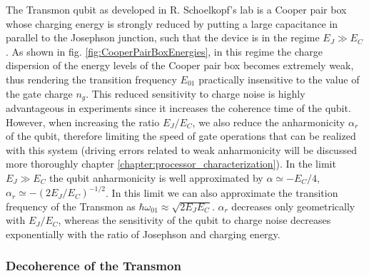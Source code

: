 The Transmon qubit as developed in R. Schoelkopf's lab \cite{koch_charge-insensitive_2007,wallraff_strong_2004} is a Cooper pair box whose charging energy is strongly reduced by putting a large capacitance in parallel to the Josephson junction, such that the device is in the regime $E_J\gg E_C$. As shown in fig. \ref{fig:CooperPairBoxEnergies}, in this regime the charge dispersion of the energy levels of the Cooper pair box becomes extremely weak, thus rendering the transition frequency $E_{01}$ practically insensitive to the value of the gate charge $n_g$. This reduced sensitivity to charge noise is highly advantageous in experiments since it increases the coherence time of the qubit. However, when increasing the ratio $E_J/E_C$, we also reduce the anharmonicity $\alpha_r$ of the qubit, therefore limiting the speed of gate operations that can be realized with this system (driving errors related to weak anharmonicity will be discussed more thoroughly chapter \ref{chapter:processor_characterization}). In the limit $E_J \gg E_C$ the qubit anharmonicity is well approximated by $\alpha \simeq -E_C/4$, $\alpha_r \simeq -(2 E_J / E_C)^{-1/2}$. In this limit we can also approximate the transition frequency of the Transmon as $\hbar\omega_{01}\approx \sqrt{2E_J E_C}$. $\alpha_r$ decreases only geometrically with $E_J/E_C$, whereas the sensitivity of the qubit to charge noise decreases exponentially with the ratio of Josephson and charging energy.

\subsubsection{Decoherence of the Transmon}

